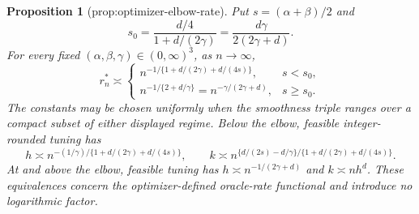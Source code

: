 \documentclass{article}
\newtheorem{proposition}{Proposition}
\begin{document}
\begin{proposition}[prop:optimizer-elbow-rate]\label{prop:optimizer-elbow-rate}
Put \(s=(\alpha+\beta)/2\) and
\[
 s_0=\frac{d/4}{1+d/(2\gamma)}=\frac{d\gamma}{2(2\gamma+d)}.
\]
For every fixed \((\alpha,\beta,\gamma)\in(0,\infty)^3\), as \(n\to\infty\),
\[
 r_n^*\asymp
 \begin{cases}
 n^{-1/\{1+d/(2\gamma)+d/(4s)\}},&s<s_0,\\
 n^{-1/\{2+d/\gamma\}}=n^{-\gamma/(2\gamma+d)},&s\geq s_0.
 \end{cases}
\]
The constants may be chosen uniformly when the smoothness triple ranges over a compact subset of either displayed regime.  Below the elbow, feasible integer-rounded tuning has
\[
 h\asymp n^{-(1/\gamma)/\{1+d/(2\gamma)+d/(4s)\}},\qquad
 k\asymp n^{\{d/(2s)-d/\gamma\}/\{1+d/(2\gamma)+d/(4s)\}}.
\]
At and above the elbow, feasible tuning has \(h\asymp n^{-1/(2\gamma+d)}\) and \(k\asymp nh^d\).  These equivalences concern the optimizer-defined oracle-rate functional and introduce no logarithmic factor.
\end{proposition}
\end{document}
